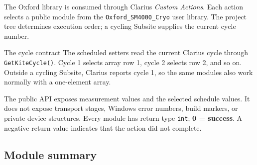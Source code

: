 \documentclass[10pt,a4paper]{article}
\newcommand{\api}[1]{\nolinkurl{#1}}
\newcommand{\statusok}{\textcolor{OxfordTeal}{\textbf{0 = success}}}
\begin{document}
The Oxford library is consumed through Clarius \emph{Custom Actions}. Each
action selects a public module from the \api{Oxford_SM4000_Cryo} user library.
The project tree determines execution order; a cycling Subsite supplies the
current cycle number.

\begin{apibox}{The cycle contract}
The scheduled setters read the current Clarius cycle through
\api{GetKiteCycle()}. Cycle 1 selects array row 1, cycle 2 selects row 2, and
so on. Outside a cycling Subsite, Clarius reports cycle 1, so the same modules
also work normally with a one-element array.
\end{apibox}

The public API exposes measurement values and the selected schedule values.
It does not expose transport stages, Windows error numbers, build markers, or
private device structures. Every module has return type \api{int};
\statusok. A negative return value indicates that the action did not complete.

\subsection{Module summary}
\end{document}
